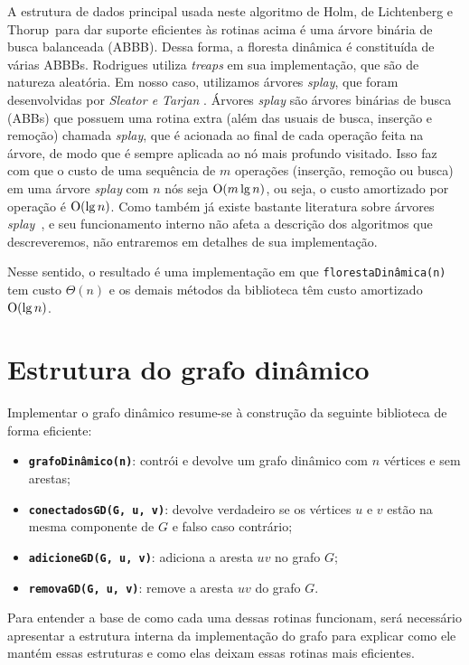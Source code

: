 A estrutura de dados principal usada neste algoritmo de Holm, de Lichtenberg e Thorup~para dar suporte eficientes às rotinas acima é uma árvore binária de busca balanceada (ABBB). Dessa forma, a floresta dinâmica é constituída de várias ABBBs. Rodrigues utiliza \textit{treaps} em sua implementação, que são de natureza aleatória. Em nosso caso, utilizamos árvores \textit{splay}, que foram desenvolvidas por \textit{Sleator e Tarjan} \cite{sleator}. Árvores \textit{splay} são árvores binárias de busca (ABBs) que possuem uma rotina extra (além das usuais de busca, inserção e remoção) chamada \textit{splay}, que é acionada ao final de cada operação feita na árvore, de modo que é sempre aplicada ao nó mais profundo visitado. Isso faz com que o custo de uma sequência de $m$ operações (inserção, remoção ou busca) em uma árvore \textit{splay} com $n$ nós seja $\mathrm{O}(m\lg n)$, ou seja, o custo amortizado por operação é $\mathrm{O}(\lg n)$. Como também já existe bastante literatura sobre árvores \textit{splay}~\cite[Lecture 12]{kozen}, e seu funcionamento interno não afeta a descrição dos algoritmos que descreveremos, não entraremos em detalhes de sua implementação.

Nesse sentido, o resultado é uma implementação em que \texttt{florestaDinâmica(n)} tem custo $\Theta(n)$ e os demais métodos da biblioteca têm custo amortizado $\mathrm{O}(\lg n)$.

\section{Estrutura do grafo dinâmico}
\label{sec:dynamic-graph-structure}

Implementar o grafo dinâmico resume-se à construção da seguinte biblioteca de forma eficiente:

\begin{itemize}
    \item \texttt{\textbf{grafoDinâmico(n)}}: contrói e devolve um grafo dinâmico com $n$ vértices e sem arestas;
    \item \texttt{\textbf{conectadosGD(G, u, v)}}: devolve verdadeiro se os vértices $u$ e $v$ estão na mesma componente de $G$ e falso caso contrário;
    \item \texttt{\textbf{adicioneGD(G, u, v)}}: adiciona a aresta $uv$ no grafo $G$;
    \item \texttt{\textbf{removaGD(G, u, v)}}: remove a aresta $uv$ do grafo $G$.
\end{itemize} 

Para entender a base de como cada uma dessas rotinas funcionam, será necessário apresentar a estrutura interna da implementação do grafo para explicar como ele mantém essas estruturas e como elas deixam essas rotinas mais eficientes.

